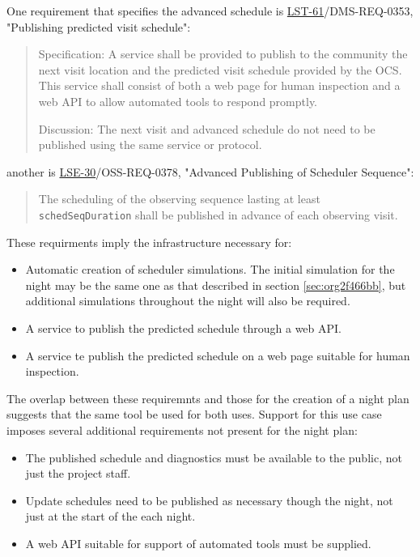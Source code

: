 One requirement that specifies the advanced schedule is \href{https://ls.st/lse-61}{LST-61}/DMS-REQ-0353, "Publishing predicted visit schedule":
\begin{quote}
Specification: A service shall be provided to publish to the community the next visit location and the predicted visit schedule provided by the OCS. This service shall consist of both a web page for human inspection and a web API to allow automated tools to respond promptly.

Discussion: The next visit and advanced schedule do not need to be published using the same service or protocol.
\end{quote}
another is \href{https://ls.st/lse-30}{LSE-30}/OSS-REQ-0378, "Advanced Publishing of Scheduler Sequence":
\begin{quote}
The scheduling of the observing sequence lasting at least \texttt{schedSeqDuration} shall be published in advance of each observing visit.
\end{quote}

These requirments imply the infrastructure necessary for:
\begin{itemize}
\item Automatic creation of scheduler simulations. The initial simulation for the night may be the same one as that described in section \ref{sec:org2f466bb}, but additional simulations throughout the night will also be required.
\item A service to publish the predicted schedule through a web API.
\item A service te publish the predicted schedule on a web page suitable for human inspection.
\end{itemize}

The overlap between these requiremnts and those for the creation of a night plan suggests that the same tool be used for both uses. 
Support for this use case imposes several additional requirements not present for the night plan:
\begin{itemize}
\item The published schedule and diagnostics must be available to the public, not just the project staff.
\item Update schedules need to be published as necessary though the night, not just at the start of the each night.
\item A web API suitable for support of automated tools must be supplied.
\end{itemize}

